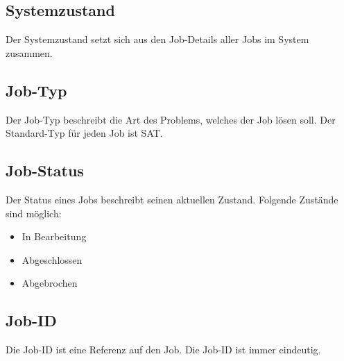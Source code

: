 \subsection{Systemzustand}
\label{B:Systemzustand}
Der Systemzustand setzt sich aus den Job-Details aller Jobs im System zusammen.

\subsection{Job-Typ}
\label{B:Job-Typ}
Der Job-Typ beschreibt die Art des Problems, welches der Job lösen soll. Der Standard-Typ für jeden Job ist \gls{SAT}.

\subsection{Job-Status}
\label{B:Job-Status}
Der Status eines Jobs beschreibt seinen aktuellen Zustand. Folgende Zustände sind möglich:
\begin{itemize}[noitemsep]
    \item In Bearbeitung
    \item Abgeschlossen
    \item Abgebrochen
\end{itemize}

\subsection{Job-ID}
\label{B:Job-ID}
Die Job-ID ist eine Referenz auf den Job. Die Job-ID ist immer eindeutig.

